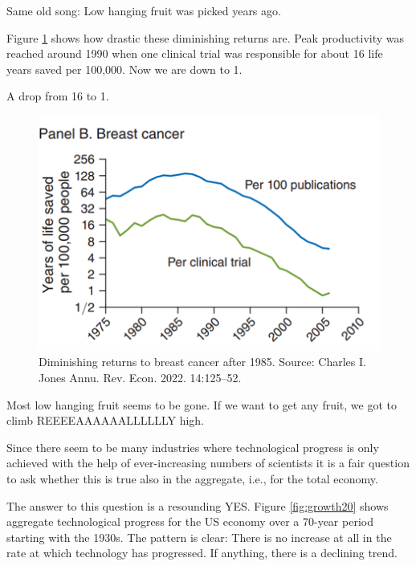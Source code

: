 \documentclass[
]{book}
\begin{document}
Same old song: Low hanging fruit was picked years ago.

Figure \ref{fig:growth19} shows how drastic these diminishing returns are. Peak productivity was reached around 1990 when one clinical trial was responsible for about 16 life years saved per 100,000. Now we are down to 1.

A drop from 16 to 1.

\begin{figure}

{\centering \includegraphics[width=1\linewidth]{img/growth/moore19} 

}

\caption{Diminishing returns to breast cancer after 1985. Source: Charles I. Jones Annu. Rev. Econ. 2022. 14:125–52.}\label{fig:growth19}
\end{figure}

Most low hanging fruit seems to be gone. If we want to get any fruit, we got to climb REEEEAAAAAALLLLLLY high.

Since there seem to be many industries where technological progress is only achieved with the help of ever-increasing numbers of scientists it is a fair question to ask whether this is true also in the aggregate, i.e., for the total economy.

The answer to this question is a resounding YES. Figure \ref{fig:growth20} shows aggregate technological progress for the US economy over a 70-year period starting with the 1930s. The pattern is clear: There is no increase at all in the rate at which technology has progressed. If anything, there is a declining trend.
\end{document}
